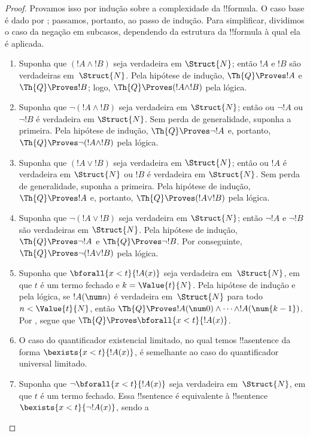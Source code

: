 \documentclass[../../../include/open-logic-section]{subfiles}
\begin{document}
\begin{proof}
Provamos isso por indução sobre a complexidade da !!{formula}.
%
O caso base é dado por ; passamos,
portanto, ao passo de indução. Para simplificar, dividimos o caso da
negação em subcasos, dependendo da estrutura da !!{formula} à qual ela
é aplicada.

\begin{enumerate}
\item Suponha que $(!A \land !B)$ seja verdadeira em $\Struct{N}$;
então $!A$ e $!B$ são verdadeiras em~$\Struct{N}$. Pela hipótese de
indução, $\Th{Q} \Proves !A$ e $\Th{Q} \Proves !B$; logo,
$\Th{Q} \Proves (!A \land !B)$ pela lógica.
%
\item Suponha que $\lnot (!A \land !B)$ seja verdadeira em
$\Struct{N}$; então ou $\lnot !A$ ou $\lnot !B$ é verdadeira em
$\Struct{N}$. Sem perda de generalidade, suponha a primeira. Pela
hipótese de indução, $\Th{Q} \Proves \lnot !A$ e, portanto,
$\Th{Q} \Proves \lnot (!A \land !B)$ pela lógica.
%
\item Suponha que $(!A \lor !B)$ seja verdadeira em $\Struct{N}$;
então ou $!A$ é verdadeira em $\Struct{N}$ ou $!B$ é verdadeira em
$\Struct{N}$. Sem perda de generalidade, suponha a primeira. Pela
hipótese de indução, $\Th{Q} \Proves !A$ e, portanto,
$\Th{Q} \Proves (!A \lor !B)$ pela lógica.
%
\item Suponha que $\lnot(!A \lor !B)$ seja verdadeira em
$\Struct{N}$; então $\lnot !A$ e $\lnot !B$ são verdadeiras em
$\Struct{N}$. Pela hipótese de indução,
$\Th{Q} \Proves \lnot !A$ e $\Th{Q} \Proves \lnot !B$. Por
conseguinte, $\Th{Q} \Proves \lnot(!A \lor !B)$ pela lógica.
%
\item Suponha que $\bforall{x<t}{!A(x)}$ seja verdadeira
em~$\Struct{N}$, em que $t$ é um termo fechado e $k=\Value{t}{N}$.
Pela hipótese de indução e pela lógica, se $!A(\num n)$ é verdadeira
em~$\Struct{N}$ para todo $n < \Value{t}{N}$, então
$\Th{Q} \Proves !A(\num 0) \land \dots \land !A(\num{k-1})$. Por
, segue que
$\Th{Q} \Proves \bforall{x<t}{!A(x)}$.
%
\item O caso do quantificador existencial limitado, no qual temos
!!a{sentence} da forma $\bexists{x < t}{!A(x)}$, é semelhante ao caso
do quantificador universal limitado.
%
\item Suponha que $\lnot \bforall{x<t}{!A(x)}$ seja verdadeira
em~$\Struct{N}$, em que $t$ é um termo fechado. Essa !!{sentence} é
equivalente à !!{sentence} $\bexists{x<t}{\lnot !A(x)}$, sendo a

\end{enumerate}
\end{proof}
\end{document}
